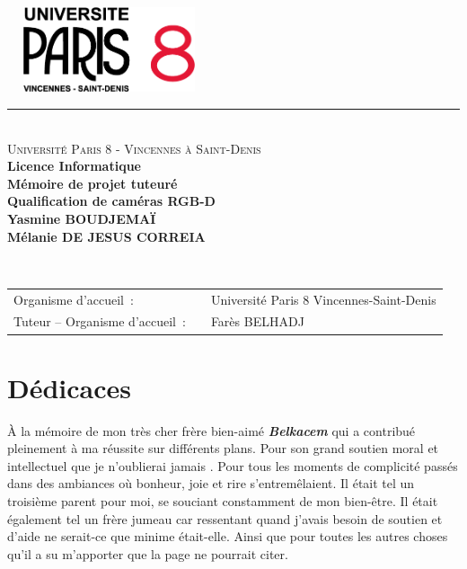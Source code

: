 \documentclass[a4paper, 12pt]{book}
\begin{document}
\begin{titlepage}
  \begin{center}
      \includegraphics[height=2.5cm, width=6cm]{images/paris8Logo.png}
    \small 
    \rule{\textwidth}{.5pt}~\\
    \large 
    \textsc{Université Paris 8 - Vincennes à Saint-Denis}\vspace{0.5cm}\\
    \textbf{Licence Informatique}\vspace{3.0cm}\\
    \Large
    \textbf{Mémoire de projet tuteuré}\\
    \textbf{Qualification de caméras RGB-D}\vspace{1.5cm}\\
    
    \large
    \textbf{Yasmine BOUDJEMAÏ}\\
    \textbf{Mélanie DE JESUS CORREIA}\vspace{1.5cm}\\
  \end{center}\vspace{3.5cm}~\\
  \begin{tabular}{ll}
    \hspace{-0.45cm}Organisme d'accueil~:~&~Université Paris 8 Vincennes-Saint-Denis\\
    \hspace{-0.45cm}Tuteur -- Organisme d'accueil~:~&~Farès  \textsc{BELHADJ}\\
  \end{tabular}
\end{titlepage}
\frontmatter



\chapter*{Dédicaces}
À la mémoire de mon très cher frère bien-aimé \emph{\textbf{Belkacem}} qui a contribué pleinement à ma réussite sur différents plans. Pour son grand soutien moral et intellectuel que je n'oublierai jamais . Pour tous les moments de complicité passés dans des ambiances où bonheur, joie et rire s'entremêlaient. Il était tel un troisième parent pour moi, se souciant constamment de mon bien-être. Il était également tel un frère jumeau car ressentant quand j'avais besoin de soutien et d'aide ne serait-ce que minime était-elle. Ainsi que pour toutes les autres choses qu'il a su m'apporter que la page ne pourrait citer.
\end{document}
